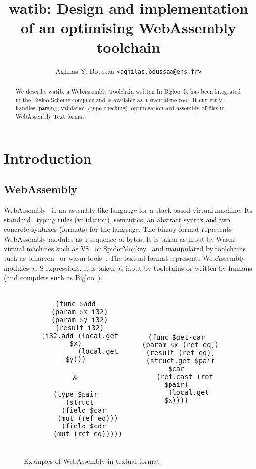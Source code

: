 \documentclass[11pt]{article}
\author{Aghilas Y. Boussaa \texttt{<aghilas.boussaa@ens.fr>}}
\title{\textsf{watib}: Design and implementation of an optimising WebAssembly toolchain}
\begin{document}
\maketitle
\begin{abstract}
  We describe watib: a WebAssembly Toolchain written In Bigloo. It has
  been integrated in the Bigloo Scheme compiler and is available as a standalone
  tool. It currently handles, parsing, validation (type checking), optimisation
  and assembly of files in WebAssembly Text format.
\end{abstract}

\section{Introduction}
\subsection{WebAssembly}
WebAssembly~\cite{haas2017bringing} is an assembly-like language for a
stack-based virtual machine. Its standard~\cite{WebAssemblyCoreSpecification3}
typing rules (validation), semantics, an abstract syntax and two concrete
syntaxes (formats) for the language. The binary format represents WebAssembly
modules as a sequence of bytes. It is taken as input by Wasm virtual machines
such as V8~\cite{V8} or SpiderMonkey~\cite{SpiderMonkey} and manipulated by
toolchains such as binaryen~\cite{Binaryen} or wasm-tools~\cite{WasmTools}. The
textual format represents WebAssembly modules as S-expressions. It is taken as
input by toolchains or written by humans (and compilers such as
Bigloo~\cite{Bigloo}).
\begin{figure}[h]
\centering
\begin{tabular}{c c c}
\begin{minipage}{1.8in}
\begin{verbatim}
(func $add
  (param $x i32)
  (param $y i32)
  (result i32)
  (i32.add (local.get $x)
           (local.get $y)))
\end{verbatim}
\end{minipage}&
\begin{minipage}{1.6in}
\begin{verbatim}
(type $pair
  (struct
    (field $car
      (mut (ref eq)))
    (field $cdr
      (mut (ref eq)))))
\end{verbatim}
\end{minipage}
&\begin{minipage}{1.8in}
\begin{verbatim}
(func $get-car
  (param $x (ref eq))
  (result (ref eq))
  (struct.get $pair $car
    (ref.cast (ref $pair)
      (local.get $x))))
\end{verbatim}
\end{minipage}
\end{tabular}
\caption{Examples of WebAssembly in textual format}
\end{figure}
\end{document}
